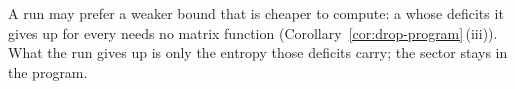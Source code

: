 
A run may prefer a weaker bound that is cheaper to compute: a
 whose deficits it gives up for every
 needs no matrix function (Corollary~\ref{cor:drop-program}\,(iii)). What the run
gives up is only the entropy those deficits carry; the sector stays in the
program.

